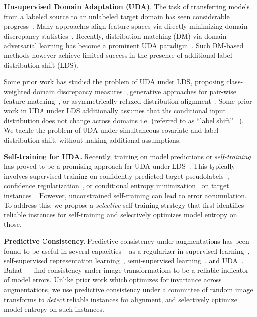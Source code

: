 \documentclass[10pt,twocolumn,letterpaper]{article}
\begin{document}
\noindent\textbf{Unsupervised Domain Adaptation (UDA)}. The task of transferring models from a labeled source to an unlabeled target domain has seen considerable progress~\cite{ganin2014unsupervised,hoffman2017cycada,saenko2010adapting,tzeng2014deep}. Many approaches align feature spaces via directly minimizing domain discrepancy statistics~\cite{kang2019contrastive,long2015learning,tzeng2014deep}. Recently, distribution matching (DM) via domain-adversarial learning has become a prominent UDA paradigm~\cite{ganin2014unsupervised,long2018conditional,saito2018adversarial,tzeng2017adversarial,zhang2019bridging}. Such DM-based methods however achieve limited success in the presence of additional label distribution shift (LDS). 

Some prior work has studied the problem of UDA under LDS, proposing class-weighted domain discrepancy measures~\cite{wang2017balanced,yan2017mind}, generative approaches for pair-wise feature matching~\cite{takahashi2020partially}, or asymmetrically-relaxed distribution alignment~\cite{you2019universal}. Some prior work in UDA under LDS additionally assumes that the conditional input distribution does not change across domains i.e.  (referred to as ``label shift'' ~\cite{azizzadenesheli2018regularized,lipton2018detecting,tachet2020domain}). We tackle the problem of UDA under simultaneous covariate and label distribution shift, without making additional assumptions.

\noindent \textbf{Self-training for UDA.} Recently, training on model predictions or \emph{self-training} has proved to be a promising approach for UDA under LDS~\cite{tan2019generalized,li2020rethinking}. This typically involves supervised training on confidently predicted target pseudolabels~\cite{tan2019generalized}, confidence regularization~\cite{zou2019confidence}, or conditional entropy minimization~\cite{grandvalet2005semi} on target instances~\cite{li2020rethinking}. However, unconstrained self-training can lead to error accumulation. To address this, we propose a \emph{selective} self-training strategy that first identifies reliable instances for self-training and selectively optimizes model entropy on those.

 
\noindent\textbf{Predictive Consistency.} Predictive consistency under augmentations has been found to be useful in several capacities -- as a regularizer in supervised learning~\cite{cubuk2020randaugment}, self-supervised representation learning~\cite{chen2020simple}, semi-supervised learning~\cite{sajjadi2016regularization,berthelot2019mixmatch,xie2020unsupervised,sohn2020fixmatch}, and UDA~\cite{li2020rethinking}. Bahat ~\etal~\cite{bahat2019natural} find consistency under image transformations to be a reliable indicator of model errors.
Unlike prior work which optimizes for invariance across augmentations, we use predictive consistency under a committee of random image transforms to \emph{detect} reliable instances for alignment, and selectively optimize model entropy on such instances.
 \vspace{-5pt}
\end{document}
